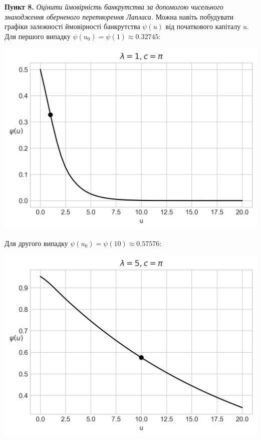 \documentclass{extreport}
\newcommand{\task}[1]{\vspace{0.5em}\noindent\textbf{#1.}}
\begin{document}
\task{Пункт 8} \emph{Оцінити ймовірність банкрутства за допомогою чисельного знаходження оберненого перетворення Лапласа.}
Можна навіть побудувати графіки залежності ймовірності банкрутства $\psi(u)$ від початкового капіталу $u$. Для першого випадку 
$\psi(u_0) = \psi(1) \approx 0.32745$:
\begin{center}
    \includegraphics[scale=0.7]{psi_1.png}
\end{center}
Для другого випадку $\psi(u_0) = \psi(10) \approx 0.57576$:
\begin{center}
    \includegraphics[scale=0.7]{psi_2.png}
\end{center}
\end{document}
